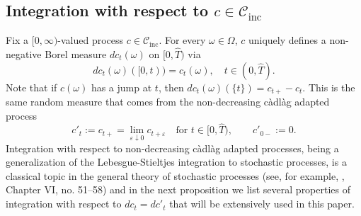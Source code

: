 \documentclass[11pt, oneside]{article}   	%
\theoremstyle{plain}
\theoremstyle{definition}
\theoremstyle{remark}
\begin{document}

\subsection{Integration with respect to $c\in\mathcal{C}_{\text{inc}}$}

Fix a $[0,\infty)$-valued process $c\in\mathcal{C}_{\text{inc}}$. For every $\omega\in\Omega$, $c$ uniquely defines a non-negative Borel measure $dc_t(\omega)$ on $[0,\hat{T})$ via
$$dc_t(\omega)([0,t))=c_{t}(\omega),\quad t\in(0,\hat{T}).$$
Note that if $c(\omega)$ has a jump at $t$, then $dc_t(\omega)(\{t\})=c_{t+}-c_t$. This is the same random measure that comes from the non-decreasing c\`adl\`ag adapted process 
$$c'_t:=c_{t+}=\lim_{\varepsilon\downarrow 0}c_{t+\varepsilon}\quad\text{for } t\in[0,\hat{T}),\quad\quad c'_{0-}:=0.$$
Integration with respect to non-decreasing c\`adl\`ag adapted processes, being a generalization of the Lebesgue-Stieltjes integration to stochastic processes, is a classical topic in the general theory of stochastic processes (see, for example, \cite{dellacherie-meyerB}, Chapter VI, no. 51--58) and in the next proposition we list several properties of integration with respect to $dc_t=dc'_t$ that will be extensively used in this paper.
\end{document}
